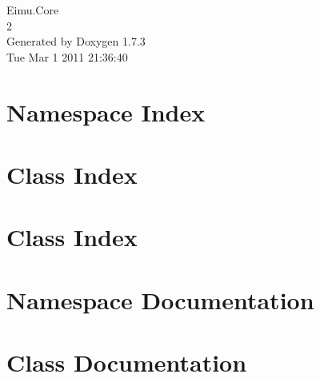\documentclass[a4paper]{book}
\begin{document}
\hypersetup{pageanchor=false}
\begin{titlepage}
\vspace*{7cm}
\begin{center}
{\Large Eimu.Core \\[1ex]\large 2 }\\
\vspace*{1cm}
{\large Generated by Doxygen 1.7.3}\\
\vspace*{0.5cm}
{\small Tue Mar 1 2011 21:36:40}\\
\end{center}
\end{titlepage}
\clearemptydoublepage
{}
\tableofcontents
\clearemptydoublepage
{}
\hypersetup{pageanchor=true}
\chapter{Namespace Index}

\chapter{Class Index}

\chapter{Class Index}

\chapter{Namespace Documentation}





\chapter{Class Documentation}



















\printindex
\end{document}
